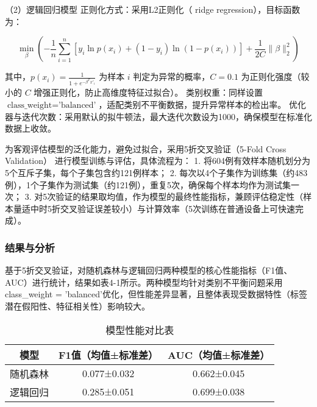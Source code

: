 \documentclass[withoutpreface,bwprint]{cumcmthesis} %
\begin{document}
（2）逻辑回归模型
正则化方式：采用L2正则化（ ridge regression），目标函数为：  

\begin{equation}
\min_{\beta} \left( -\frac{1}{n} \sum_{i=1}^n [y_i \ln p(x_i) + (1-y_i) \ln (1-p(x_i))] + \frac{1}{2C} \|\beta\|_2^2 \right)
\end{equation}


其中，$ p(x_i) = \frac{1}{1+e^{-\beta^T x'_i}} $ 为样本 $ i $ 判定为异常的概率，$ C = 0.1 $ 为正则化强度（较小的 $ C $ 增强正则化，防止高维度特征过拟合）。  
类别权重：同样设置 $ \text{class\_weight} = \text{'balanced'} $，适配类别不平衡数据，提升异常样本的检出率。  
优化器与迭代次数：采用默认的拟牛顿法，最大迭代次数设为1000，确保模型在标准化数据上收敛。

为客观评估模型的泛化能力，避免过拟合，采用5折交叉验证（5-Fold Cross Validation） 进行模型训练与评估，具体流程为：  
1. 将604例有效样本随机划分为5个互斥子集，每个子集包含约121例样本；  
2. 每次以4个子集作为训练集（约483例），1个子集作为测试集（约121例），重复5次，确保每个样本均作为测试集一次；  
3. 对5次验证的结果取均值，作为模型的最终性能指标，兼顾评估稳定性（样本量适中时5折交叉验证误差较小）与计算效率（5次训练在普通设备上可快速完成）。


\subsubsection{结果与分析}

基于5折交叉验证，对随机森林与逻辑回归两种模型的核心性能指标（F1值、AUC）进行统计，结果如表4-1所示。两种模型均针对类别不平衡问题采用class\_weight = 'balanced'优化，但性能差异显著，且整体表现受数据特性（标签潜在假阳性、特征相关性）影响较大。


\begin{table}[H]
    \centering  %
    \caption{模型性能对比表}  %
    \label{tab:模型性能对比表}  %
    \begin{threeparttable}
        \begin{tabularx}{0.75\textwidth}{c c c}
            \toprule[1.5pt]
            \textbf{模型} & \textbf{F1值（均值±标准差）} & \textbf{AUC（均值±标准差）} \\ 
            \midrule[1pt]
            随机森林 & 0.077±0.032 & 0.662±0.045 \\
            逻辑回归 & 0.285±0.051 & 0.699±0.038 \\

            \bottomrule[1.5pt]
        
        \end{tabularx}
    \end{threeparttable}
\end{table}
\end{document}
